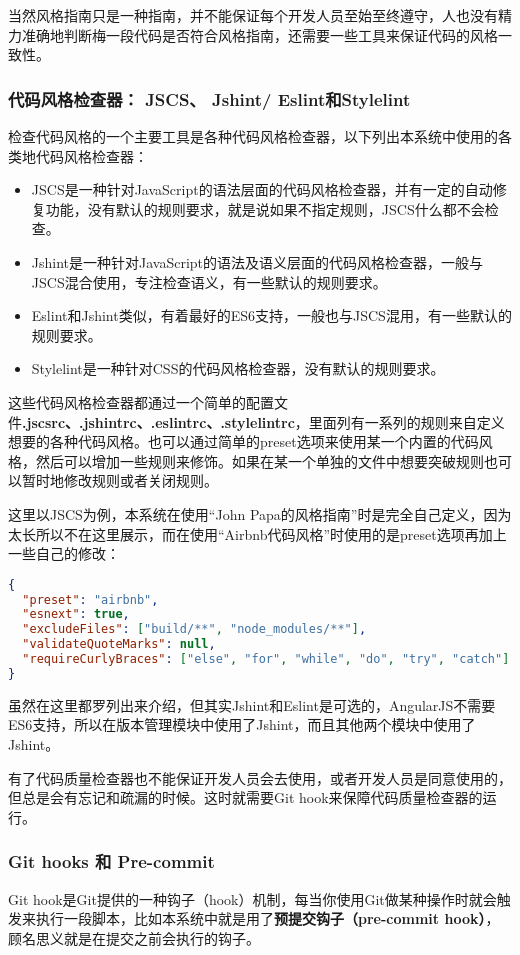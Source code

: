 当然风格指南只是一种指南，并不能保证每个开发人员至始至终遵守，人也没有精力准确地判断梅一段代码是否符合风格指南，还需要一些工具来保证代码的风格一致性。
\subsubsection{代码风格检查器： JSCS、 Jshint/ Eslint和Stylelint}
检查代码风格的一个主要工具是各种代码风格检查器，以下列出本系统中使用的各类地代码风格检查器：
\begin{itemize}
  \item JSCS是一种针对JavaScript的语法层面的代码风格检查器，并有一定的自动修复功能，没有默认的规则要求，就是说如果不指定规则，JSCS什么都不会检查。
  \item Jshint是一种针对JavaScript的语法及语义层面的代码风格检查器，一般与JSCS混合使用，专注检查语义，有一些默认的规则要求。
  \item Eslint和Jshint类似，有着最好的ES6支持，一般也与JSCS混用，有一些默认的规则要求。
  \item Stylelint是一种针对CSS的代码风格检查器，没有默认的规则要求。
\end{itemize}

这些代码风格检查器都通过一个简单的配置文件\textbf{.jscsrc、.jshintrc、.eslintrc、.stylelintrc}，里面列有一系列的规则来自定义想要的各种代码风格。也可以通过简单的preset选项来使用某一个内置的代码风格，然后可以增加一些规则来修饰。如果在某一个单独的文件中想要突破规则也可以暂时地修改规则或者关闭规则。

这里以JSCS为例，本系统在使用“John Papa的风格指南”时是完全自己定义，因为太长所以不在这里展示，而在使用“Airbnb代码风格”时使用的是preset选项再加上一些自己的修改：
\begin{lstlisting}[language={JSON}, caption={Airbnb代码风格JSCS配置}]
{
  "preset": "airbnb",
  "esnext": true,
  "excludeFiles": ["build/**", "node_modules/**"],
  "validateQuoteMarks": null,
  "requireCurlyBraces": ["else", "for", "while", "do", "try", "catch"]
}
\end{lstlisting}

虽然在这里都罗列出来介绍，但其实Jshint和Eslint是可选的，AngularJS不需要ES6支持，所以在版本管理模块中使用了Jshint，而且其他两个模块中使用了Jshint。

有了代码质量检查器也不能保证开发人员会去使用，或者开发人员是同意使用的，但总是会有忘记和疏漏的时候。这时就需要Git hook来保障代码质量检查器的运行。
\subsubsection{Git hooks 和 Pre-commit}
Git hook是Git提供的一种钩子（hook）机制，每当你使用Git做某种操作时就会触发来执行一段脚本，比如本系统中就是用了\textbf{预提交钩子（pre-commit hook）}，顾名思义就是在提交之前会执行的钩子。

